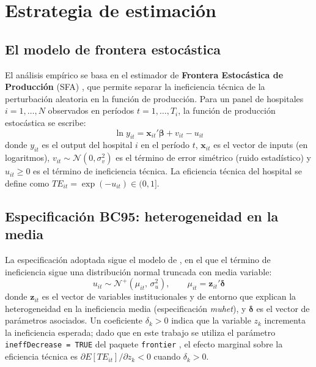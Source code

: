 
\section{Estrategia de estimación}
\label{sec:estrategia}

\subsection{El modelo de frontera estocástica}
\label{subsec:sfa_framework}

El análisis empírico se basa en el estimador de \textbf{Frontera Estocástica de Producción} (SFA) \citep{kumbhakar2000stochastic}, que permite separar la ineficiencia técnica de la perturbación aleatoria en la función de producción. Para un panel de hospitales $i = 1, \ldots, N$ observados en períodos $t = 1, \ldots, T_i$, la función de producción estocástica se escribe:
%
\begin{equation}
  \ln y_{it} = \mathbf{x}_{it}'\boldsymbol{\beta} + v_{it} - u_{it}
  \label{eq:sfa_base}
\end{equation}
%
donde $y_{it}$ es el output del hospital $i$ en el período $t$, $\mathbf{x}_{it}$ es el vector de inputs (en logaritmos), $v_{it} \sim \mathcal{N}(0, \sigma_v^2)$ es el término de error simétrico (ruido estadístico) y $u_{it} \geq 0$ es el término de ineficiencia técnica. La eficiencia técnica del hospital se define como $TE_{it} = \exp(-u_{it}) \in (0,1]$.

\subsection{Especificación BC95: heterogeneidad en la media}
\label{subsec:bc95}

La especificación adoptada sigue el modelo de \citet{battese1995model}, en el que el término de ineficiencia sigue una distribución normal truncada con media variable:
%
\begin{equation}
  u_{it} \sim \mathcal{N}^+(\mu_{it},\, \sigma_u^2), \qquad \mu_{it} = \mathbf{z}_{it}'\boldsymbol{\delta}
  \label{eq:muhet}
\end{equation}
%
donde $\mathbf{z}_{it}$ es el vector de variables institucionales y de entorno que explican la heterogeneidad en la ineficiencia media (especificación \emph{muhet}), y $\boldsymbol{\delta}$ es el vector de parámetros asociados. Un coeficiente $\delta_k > 0$ indica que la variable $z_k$ incrementa la ineficiencia esperada; dado que en este trabajo se utiliza el parámetro \texttt{ineffDecrease = TRUE} del paquete \texttt{frontier} \citep{coelli1999comparison}, el efecto marginal sobre la eficiencia técnica es $\partial E[TE_{it}] / \partial z_k < 0$ cuando $\delta_k > 0$.

